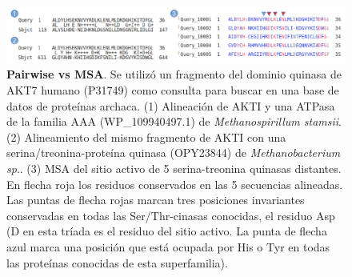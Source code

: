 \begin{figure}[htbp]
\centering
\includegraphics[width = \textwidth]{figs/msa.png}
\caption{\textbf{Pairwise vs MSA}. Se utilizó un fragmento del dominio quinasa de AKT7 humano (P31749) como consulta para buscar en una base de datos de proteínas archaca. (1) Alineación de AKTI y una ATPasa de la familia AAA (WP\_109940497.1) de \textit{Methanospirillum stamsii}. (2) Alineamiento del mismo fragmento de AKTI con una serina/treonina-proteína quinasa (OPY23844) de \textit{Methanobacterium sp}.. (3) MSA del sitio activo de 5 serina-treonina quinasas distantes. En flecha roja los residuos conservados en las 5 secuencias alineadas. Las puntas de flecha rojas marcan tres posiciones invariantes conservadas en todas las Ser/Thr-cinasas conocidas, el residuo Asp (D en esta tríada es el residuo del sitio activo. La punta de flecha azul marca una posición que está ocupada por His o Tyr en todas las proteínas conocidas de esta superfamilia).}
\label{fig:msa}
\end{figure}


